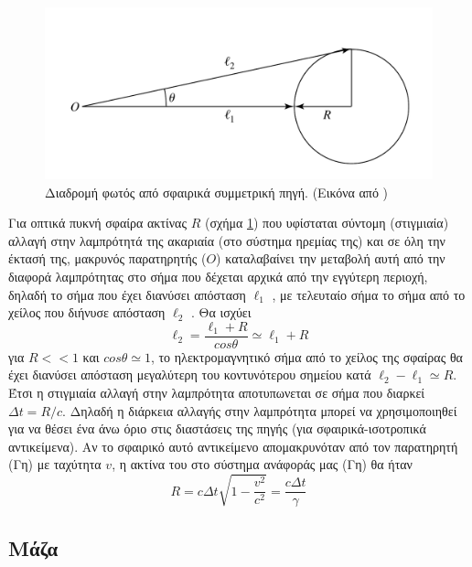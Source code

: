 \begin{figure}
 \begin{center}
 \includegraphics[scale= 0.2]{Figures/SizeView1.png}
 \caption{Διαδρομή φωτός από σφαιρικά συμμετρική πηγή. (Εικόνα από \cite{carroll_ostlie_2017})}
 \label{fig:lightpathsphere}
 \end{center}
\end{figure}
Για οπτικά πυκνή σφαίρα ακτίνας $R$ (σχήμα \ref{fig:lightpathsphere}) που υφίσταται σύντομη (στιγμιαία) αλλαγή στην λαμπρότητά της ακαριαία (στο σύστημα ηρεμίας της) και σε όλη την έκτασή της, μακρυνός παρατηρητής ($O$) καταλαβαίνει την μεταβολή αυτή από την διαφορά λαμπρότητας στο σήμα που δέχεται αρχικά από την εγγύτερη περιοχή, δηλαδή το σήμα που έχει διανύσει απόσταση $\ell_1$ , με τελευταίο σήμα το σήμα από το χείλος που διήνυσε απόσταση $\ell_2$ . Θα ισχύει
$$\ell_2 = \dfrac {\ell_1+R}{cos\theta} \simeq \ell_1+R$$
για $R<<1 $ και $cos \theta \simeq 1$, το ηλεκτρομαγνητικό σήμα από το χείλος της σφαίρας θα έχει διανύσει απόσταση μεγαλύτερη του κοντυνότερου σημείου κατά $\ell_2 - \ell_1 \simeq R$. \\
Έτσι η στιγμιαία αλλαγή στην λαμπρότητα αποτυπωνεται σε σήμα που διαρκεί $\Delta t = R/c$. Δηλαδή η διάρκεια αλλαγής στην λαμπρότητα μπορεί να χρησιμοποιηθεί για να θέσει ένα άνω όριο στις διαστάσεις της πηγής (για σφαιρικά-ισοτροπικά αντικείμενα).
Αν το σφαιρικό αυτό αντικείμενο απομακρυνόταν από τον παρατηρητή (Γη) με ταχύτητα $v$, η ακτίνα του στο σύστημα ανάφοράς μας (Γη) θα ήταν \cite{carroll_ostlie_2017}
\begin{equation}R = c\Delta t \sqrt{1-\dfrac{v^2}{c^2}}= \dfrac {c\Delta t }{\gamma} \label{eq:Radius}\end{equation}

\subsection*{Μάζα}

